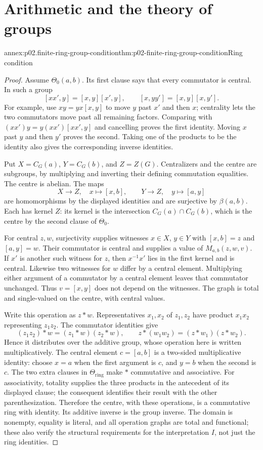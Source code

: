 \section{Arithmetic and the theory of groups}
\label{sec:annex-p02-group-theory-undecidability}

\begin{annexitem}{annex:p02.finite-ring-group-condition}{thm:p02-finite-ring-group-condition}{Ring condition}
\begin{proof}
Assume \(\Theta_0(a,b)\). Its first clause says that every commutator is
central. In such a group
\[
 [xx',y]=[x,y][x',y],\qquad [x,yy']=[x,y][x,y'].
\]
For example, use \(xy=yx[x,y]\) to move \(y\) past \(x'\) and then
\(x\); centrality lets the two commutators move past all remaining
factors. Comparing with \((xx')y=y(xx')[xx',y]\) and cancelling proves
the first identity. Moving \(x\) past \(y\) and then \(y'\) proves
the second. Taking one of the products to be the identity also gives
the corresponding inverse identities.

Put \(X=C_G(a)\), \(Y=C_G(b)\), and \(Z=Z(G)\).
Centralizers and the centre are subgroups, by multiplying and inverting
their defining commutation equalities. The centre is abelian. The maps
\[
 X\longrightarrow Z,\quad x\longmapsto[x,b],\qquad
 Y\longrightarrow Z,\quad y\longmapsto[a,y]
\]
are homomorphisms by the displayed identities and are surjective by
\(\beta(a,b)\). Each has kernel \(Z\): its kernel is the intersection
\(C_G(a)\cap C_G(b)\), which is the centre by the second clause of
\(\Theta_0\).

For central \(z,w\), surjectivity supplies witnesses \(x\in X\),
\(y\in Y\) with \([x,b]=z\) and \([a,y]=w\). Their commutator is
central and supplies a value of \(M_{a,b}(z,w,v)\). If \(x'\) is
another such witness for \(z\), then \(x^{-1}x'\) lies in the first
kernel and is central. Likewise two witnesses for \(w\) differ by
a central element. Multiplying either argument of a commutator by a
central element leaves that commutator unchanged. Thus \(v=[x,y]\)
does not depend on the witnesses. The graph is total and single-valued
on the centre, with central values.

Write this operation as \(z*w\). Representatives \(x_1,x_2\) of
\(z_1,z_2\) have product \(x_1x_2\) representing \(z_1z_2\).
The commutator identities give
\[
 (z_1z_2)*w=(z_1*w)(z_2*w),\qquad
 z*(w_1w_2)=(z*w_1)(z*w_2).
\]
Hence it distributes over the additive group, whose operation here is
written multiplicatively. The central element \(c=[a,b]\) is a
two-sided multiplicative identity: choose \(x=a\) when the first
argument is \(c\), and \(y=b\) when the second is \(c\).
The two extra clauses in \(\Theta_{\mathrm{ring}}\) make \(*\)
commutative and associative. For associativity, totality supplies the
three products in the antecedent of its displayed clause; the consequent
identifies their result with the other parenthesization. Therefore the
centre, with these operations, is a commutative ring with identity.
Its additive inverse is the group inverse. The domain is nonempty,
equality is literal, and all operation graphs are total and functional;
these also verify the structural requirements for the interpretation
\(I\), not just the ring identities.


\end{proof}
\end{annexitem}
